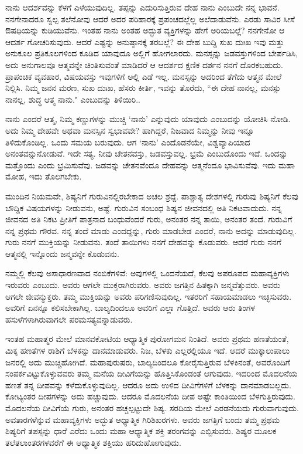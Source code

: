 ನಾನು ಆದರ್ಶವನ್ನು ಕೆಳಗೆ ಎಳೆಯುವುದಿಲ್ಲ. ತಪ್ಪನ್ನು ಎದುರಿಸುತ್ತಿರುವ ದೇಹ ನಾನು ಎಂಬುದೇ ನನ್ನ ಭಾವನೆ. ನನಗೇನಾದರೂ ಸ್ವಲ್ಪ ತಲೆನೋವು ಆದರೆ ಅದರ ಪರಿಹಾರಕ್ಕೆ ಪ್ರಪಂಚದಲ್ಲೆಲ್ಲ ಅಲೆದಾಡುವೆನು. ಎರಡು ಸಾವಿರ ಸೀಸೆ ಔಷಧಿಯನ್ನು ಕುಡಿಯುವೆನು. ಇಂತಹ ನಾನು ಅಂತಹ ಅದ್ಭುತ ವ್ಯಕ್ತಿಗಳನ್ನು ಹೇಗೆ ಅರಿಯಬಲ್ಲೆ? ನನಗೇನೋ ಆ ಆದರ್ಶ ಗೋಚರಿಸುವುದು. ಆದರೆ ಎಷ್ಟನ್ನು ಅನುಷ್ಠಾನಕ್ಕೆ ತರಬಲ್ಲೆ? ಈ ದೇಹ ಬುದ್ದಿ ಸುಖ ದುಃಖ ಇವು ಮತ್ತು ಅನುಕೂಲ ಪ್ರತಿಕೂಲಗಳಿಂದ ಕೂಡಿದ ಯಾವುದೂ ಅಲ್ಲಿಗೆ ಹೋಗಲಾರದು. ಮನಸ್ಸನ್ನು ಜಡವಸ್ತುಗಳಿಂದ ಬೇರ್ಪಡಿಸಿ, ಅದು ಅನುಗಾಲವೂ ಆತ್ಮವನ್ನೇ ಚಿಂತಿಸುವಂತೆ ಮಾಡಿದರೆ ಆ ಆದರ್ಶದ ಕ್ಷಣಿಕ ದರ್ಶನ ನನಗೆ ದೊರಕಬಹುದು. ಪ್ರಾಪಂಚಿಕ ವ್ಯವಹಾರ, ವಿಷಯವಸ್ತು ಇವುಗಳಿಗೆ ಅಲ್ಲಿ ಎಡೆ ಇಲ್ಲ. ಮನಸ್ಸನ್ನು ಅದರಿಂದ ತೆಗೆದು ಆತ್ಮನ ಮೇಲೆ ನಿಲ್ಲಿಸಿ. ನಿಮ್ಮ ಜನನ ಮರಣ, ಸುಖ ದುಃಖ, ಹೆಸರು ಕೀರ್ತಿ, ಇವನ್ನು ತೊರೆದು, “ಈ ದೇಹ ನಾನಲ್ಲ, ಮನಸ್ಸು ನಾನಲ್ಲ, ಶುದ್ಧ ಆತ್ಮ ನಾನು." ಎಂಬುದನ್ನು ತಿಳಿಯಿರಿ..

ನಾನು ಎಂದರೆ ಆತ್ಮ, ನಿಮ್ಮ ಕಣ್ಣುಗಳನ್ನು ಮುಚ್ಚಿ `ನಾನು' ಎನ್ನುವುದು ಯಾವುದು ಎಂಬುದನ್ನು ಯೋಚಿಸಿ ನೋಡಿ. ಅದು ನಿಮ್ಮ ದೇಹವೇ ಅಥವಾ ಮನಸ್ಸಿನ ಸ್ವಭಾವವೇ? ಹಾಗಿದ್ದರೆ, ನಿಜವಾದ ನಿಮ್ಮನ್ನು ನೀವು ಇನ್ನೂ ತಿಳಿದುಕೊಂಡಿಲ್ಲ. ಒಂದು ಸಮಯ ಬರುವುದು. ಆಗ `ನಾನು' ಎಂದೊಡನೆಯೇ, ವಿಶ್ವವ್ಯಾಪಿಯಾದ ಅನಂತವನ್ನು\break ನೋಡುವೆ. ಇದೇ ಸತ್ಯ. ನೀವು ಚೇತನವಸ್ತು, ಜಡವಸ್ತುವಲ್ಲ. ಭ್ರಮೆ ಎಂಬುದೊಂದು ಇದೆ. ಒಂದನ್ನು ಮತ್ತೊಂದು ಎಂದು ಭ್ರಮಿಸುವೆವು. ಜಡವನ್ನು ಚೇತನವೆಂದೂ ದೇಹವನ್ನು ಆತ್ಮನೆಂದೂ ಭಾವಿಸುವೆವು. ಇದು ಮಹಾ ಮೋಹ, ಇದು ತೊಲಗಬೇಕು.

ಮುಂದಿನ ನಿಯಮವೇ, ಶಿಷ್ಯನಿಗೆ ಗುರುವಿನಲ್ಲಿರಬೇಕಾದ ಅಚಲ ಶ್ರದ್ದೆ. ಪಾಶ್ಚಾತ್ಯ ದೇಶಗಳಲ್ಲಿ ಗುರುವು ಶಿಷ್ಯನಿಗೆ ಕೆಲವು ಬೌದ್ದಿಕ ವಿಷಯಗಳನ್ನು ನೀಡುವನು, ಅಷ್ಟೆ. ಗುರುವಿನ ಸಂಬಂಧ ಶಿಷ್ಯನ ಜೀವನದಲ್ಲಿ ಅತಿ ನಿಕಟವಾದುದು. ನನ್ನ ಜೀವನದ ಅತಿ ನಿಕಟ ಪ್ರೀತಿಗೆ ಪಾತ್ರನಾದ ಬಂಧುವೆಂದರೆ ಗುರು, ಅನಂತರ ನನ್ನ ತಾಯಿ, ಅನಂತರ ತಂದೆ. ಗುರುವಿಗೆ ನನ್ನ ಪ್ರಥಮ ಗೌರವ. ನನ್ನ ತಂದೆ ಮಾಡು ಎಂದದ್ದನ್ನು, ಗುರು ಮಾಡಬೇಡ ಎಂದರೆ, ನಾನು ಅದನ್ನು ಮಾಡುವುದಿಲ್ಲ. ಗುರು ನನಗೆ ಮುಕ್ತಿಯನ್ನು ನೀಡುವನು. ತಂದೆ ತಾಯಿಗಳು ನನಗೆ ದೇಹವನ್ನು ಕೊಡುವರು. ಆದರೆ ಗುರು ನನಗೆ ಆತ್ಮನಲ್ಲಿ ಇನ್ನೊಂದು ಜನ್ಮವನ್ನೇ ಕೊಡುವನು.

ನಮ್ಮಲ್ಲಿ ಕೆಲವು ಅಸಾಧಾರಣವಾದ ನಂಬಿಕೆಗಳಿವೆ: ಅವುಗಳಲ್ಲಿ ಒಂದನೆಯದೆ, ಕೆಲವು ಅಪರೂಪದ ಮಹಾವ್ಯಕ್ತಿಗಳು ಇರುವರು ಎಂಬುದು. ಅವರು ಆಗಲೇ ಮುಕ್ತರಾಗಿರುವರು. ಅವರು ಜಗತ್ತಿನ ಹಿತಕ್ಕಾಗಿ ಜನ್ಮವೆತ್ತುವರು. ಅವರು ಆಗಲೇ ಜೀವನ್ಮುಕ್ತರು. ತಮ್ಮ ಮುಕ್ತಿಯನ್ನು ಅವರು ಪರಿಗಣಿಸುವುದಿಲ್ಲ. ಇತರರಿಗೆ ಸಹಾಯಮಾಡಲು ಇಚ್ಛಿಸುವರು. ಅವರಿಗೆ ಏನನ್ನೂ ಕಲಿಸಬೇಕಾಗಿಲ್ಲ. ಬಾಲ್ಯದಿಂದಲೂ ಅವರಿಗೆ ಎಲ್ಲಾ ಗೊತ್ತಿದೆ. ಅವರು ಆರು ತಿಂಗಳ ಹಸುಳೆಗಳಾಗಿರುವಾಗಲೇ ಪರಮಸತ್ಯವನ್ನಾಡುವರು.

ಇಂತಹ ಮಹಾತ್ಮರ ಮೇಲೆ ಮಾನವಕೋಟಿಯ ಆಧ್ಯಾತ್ಮಿಕ ಪುರೋಗಮನ ನಿಂತಿದೆ. ಅವರು ಪ್ರಥಮ ಹಣತೆಯಂತೆ, ಮಿಕ್ಕ ಹಣತೆಗಳ ರಾಶಿಗೆ ಬೆಳಕನ್ನು ದಾನಮಾಡುವರು. ನಿಜ, ಬೆಳಕು ಎಲ್ಲರಲ್ಲಿಯೂ ಇದೆ. ಆದರೆ ಮುಕ್ಕಾಲುಪಾಲು ಜನರಲ್ಲಿ ಅದು ಮುಚ್ಚಿಹೋಗಿದೆ. ಮಹಾಪುರುಷರು, ಬಾಲ್ಯದಿಂದಲೂ ಕೋರೈಸುತ್ತಿರುವ ಬೆಳಕಿನಂತೆ, ಅವರೊಂದಿಗೆ ಸಂಪರ್ಕವಿಟ್ಟುಕೊಳ್ಳುವವರು ತಮ್ಮ ಮನೆಯ ದೀವಿಗೆಯನ್ನು ಹೊತ್ತಿಸಿಕೊಂಡಂತೆ ಆಗುವುದು. ಇದರಿಂದ ಮೊದಲನೆಯ ಹಣತೆ ತನ್ನ ದೀಪವನ್ನು ಕಳೆದುಕೊಳ್ಳುವುದಿಲ್ಲ. ಆದರೂ ಅದು ಉಳಿದ ದೀವಿಗೆಗಳಿಗೆ ಬೆಳಕನ್ನು ದಾನಮಾಡಬಲ್ಲದು. ಕೋಟ್ಯಂತರ ದೀಪಗಳನ್ನು ಅದು ಹಚ್ಚುವುದು. ಆದರೂ ಮೊದಲನೆಯ ದೀಪ ಅಷ್ಟೇ ಕಾಂತಿಯಿಂದ ಬೆಳಗುತ್ತಿರುವುದು. ಮೊದಲನೆಯ ದೀವಿಗೆಯೆ ಗುರು, ಅನಂತರ ಹಚ್ಚಲ್ಪಟ್ಟುದೇ ಶಿಷ್ಯ. ಸರದಿಯ ಮೇಲೆ ಎರಡನೆಯದು ಗುರುವಾಗುವುದು. ಅವತಾರಗಳೆನ್ನುವ ಮಹಾವ್ಯಕ್ತಿಗಳು ಅದ್ಭುತ ಆಧ್ಯಾತ್ಮಿಕ ಗಿರಿಶಿಖರಗಳು. ಅವರು ಜಗತ್ತಿಗೆ ಬಂದು ತಮ್ಮ ಪ್ರಥಮ ಶಿಷ್ಯರಿಗೆ ತಪಸ್ಸನ್ನು ಧಾರೆ ಎರೆದು ಒಂದು ಮಹಾ ಆಧ್ಯಾತ್ಮಿಕ ಶಕ್ತಿ ತರಂಗವನ್ನು ಎಬ್ಬಿಸುವರು. ಶಿಷ್ಯರ ಮೂಲಕ ತಲೆತಲಾಂತರಗಳವರೆಗೆ ಈ ಆಧ್ಯಾತ್ಮಿಕ ಶಕ್ತಿಯು ಹರಿದುಹೋಗುವುದು.

